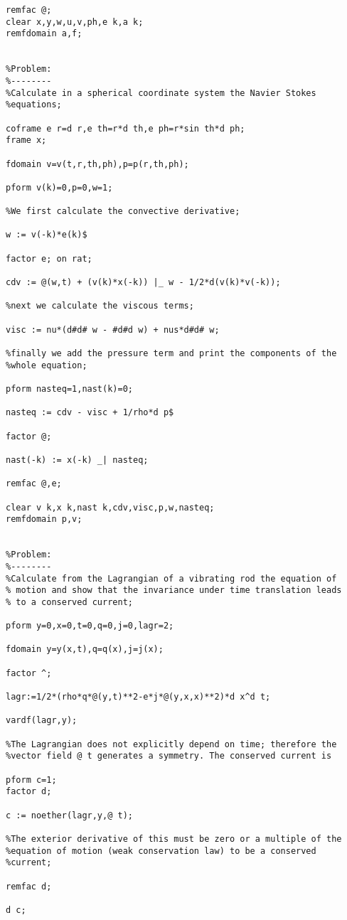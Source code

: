 {\begin{verbatim}
remfac @;
clear x,y,w,u,v,ph,e k,a k;
remfdomain a,f;


%Problem:
%--------
%Calculate in a spherical coordinate system the Navier Stokes 
%equations;

coframe e r=d r,e th=r*d th,e ph=r*sin th*d ph;
frame x;

fdomain v=v(t,r,th,ph),p=p(r,th,ph);

pform v(k)=0,p=0,w=1;

%We first calculate the convective derivative;

w := v(-k)*e(k)$

factor e; on rat;

cdv := @(w,t) + (v(k)*x(-k)) |_ w - 1/2*d(v(k)*v(-k));

%next we calculate the viscous terms;

visc := nu*(d#d# w - #d#d w) + nus*d#d# w;

%finally we add the pressure term and print the components of the
%whole equation;

pform nasteq=1,nast(k)=0;

nasteq := cdv - visc + 1/rho*d p$

factor @;

nast(-k) := x(-k) _| nasteq;

remfac @,e;

clear v k,x k,nast k,cdv,visc,p,w,nasteq;
remfdomain p,v;


%Problem:
%--------
%Calculate from the Lagrangian of a vibrating rod the equation of
% motion and show that the invariance under time translation leads
% to a conserved current;

pform y=0,x=0,t=0,q=0,j=0,lagr=2;

fdomain y=y(x,t),q=q(x),j=j(x);

factor ^;

lagr:=1/2*(rho*q*@(y,t)**2-e*j*@(y,x,x)**2)*d x^d t;

vardf(lagr,y);

%The Lagrangian does not explicitly depend on time; therefore the
%vector field @ t generates a symmetry. The conserved current is

pform c=1;
factor d;

c := noether(lagr,y,@ t);

%The exterior derivative of this must be zero or a multiple of the
%equation of motion (weak conservation law) to be a conserved
%current;

remfac d;

d c;


\end{verbatim}}
